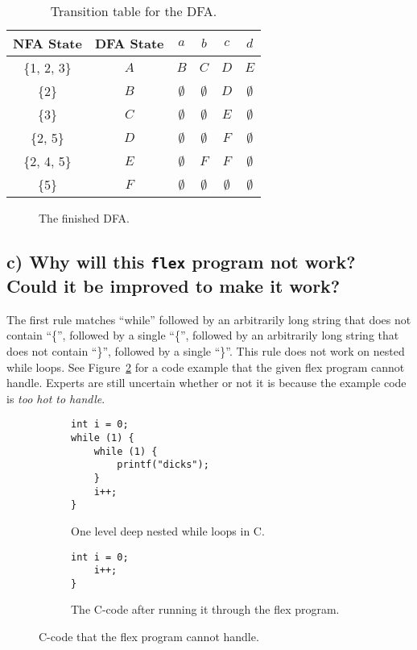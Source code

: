 \documentclass[12pt]{article}
\begin{document}
\begin{table}[H]
\begin{center}
	\begin{tabular}{|c c | c | c | c | c|}
	\hline
	NFA State & DFA State & $a$ & $b$ & $c$ & $d$ \\
	\hline \hline
	\{1, 2, 3\} & $A$ & $B$ & $C$ & $D$ & $E$ \\
	\hline 
	\{2\} & $B$ & $\emptyset$ & $\emptyset$ & $D$ & $\emptyset$ \\
	\hline 
	\{3\} & $C$ & $\emptyset$ & $\emptyset$ & $E$ & $\emptyset$ \\
	\hline 
	\{2, 5\} & $D$ & $\emptyset$ & $\emptyset$ & $F$ & $\emptyset$ \\
	\hline 
	\{2, 4, 5\} & $E$ & $\emptyset$ & $F$ & $F$ & $\emptyset$ \\
	\hline 
	\{5\} & $F$ & $\emptyset$ & $\emptyset$ & $\emptyset$ & $\emptyset$ \\
	\hline 
	\end{tabular} 
	\label{tab:1-1-b-tt}
	\caption{Transition table for the DFA.}
\end{center}
\end{table}

\begin{figure}[H]
\begin{center}
	
	\caption{The finished DFA.}
	\label{fig:1-1-b}
\end{center}
\end{figure}


\subsection{c) Why will this \texttt{flex} program not work? Could it be improved to make it work?}
The first rule matches ``while'' followed by an arbitrarily long string that does not contain ``\{'', followed by a single ``\{'', followed by an arbitrarily long string that does not contain ``\}'', followed by a single ``\}''.
This rule does not work on nested while loops.
See Figure~\ref{fig:1-1-c} for a code example that the given flex program cannot handle.
Experts are still uncertain whether or not it is because the example code is \textit{too hot to handle}.

\begin{figure}[H]
\begin{subfigure}[b]{0.5\textwidth}
\begin{verbatim}
int i = 0;
while (1) {
    while (1) {
        printf("dicks"); 
    }
	i++;
}
\end{verbatim}
\caption{One level deep nested while loops in C.}
\end{subfigure}
\begin{subfigure}[b]{0.5\textwidth}
\begin{verbatim}
int i = 0;
    i++;
}
\end{verbatim}
\caption{The C-code after running it through the flex program.}
\end{subfigure}
\caption{C-code that the flex program cannot handle.}
\label{fig:1-1-c}
\end{figure}
\end{document}
